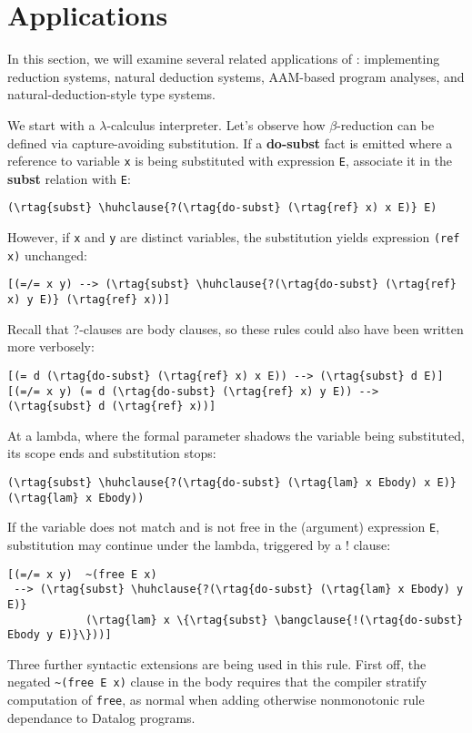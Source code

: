 \section{Applications}
\label{sec:apps}
%
In this section, we will examine several related applications of \slog{}: implementing reduction systems, natural deduction systems, AAM-based program analyses, and natural-deduction-style type systems. 

We start with a $\lambda$-calculus interpreter. Let's observe how $\beta$-reduction can be defined via capture-avoiding substitution. If a \textbf{do-subst} fact is emitted where a reference to variable \texttt{x} is being substituted with expression \texttt{E}, associate it in the \textbf{subst} relation with \texttt{E}:
%
\begin{Verbatim}[baselinestretch=0.8,commandchars=\\\{\}]
(\rtag{subst} \huhclause{?(\rtag{do-subst} (\rtag{ref} x) x E)} E)
\end{Verbatim}
%
However, if \texttt{x} and \texttt{y} are distinct variables, the substitution yields expression \texttt{(ref x)} unchanged:
%
\begin{Verbatim}[baselinestretch=0.8,commandchars=\\\{\}]
[(=/= x y) --> (\rtag{subst} \huhclause{?(\rtag{do-subst} (\rtag{ref} x) y E)} (\rtag{ref} x))]
\end{Verbatim}
%
Recall that ?-clauses are body clauses, so these rules could also have been written more verbosely:
%
\begin{Verbatim}[baselinestretch=0.8,commandchars=\\\{\}]
[(= d (\rtag{do-subst} (\rtag{ref} x) x E)) --> (\rtag{subst} d E)]
[(=/= x y) (= d (\rtag{do-subst} (\rtag{ref} x) y E)) --> (\rtag{subst} d (\rtag{ref} x))]
\end{Verbatim}

At a lambda, where the formal parameter shadows the variable being substituted, its scope ends and substitution stops:
%
\begin{Verbatim}[baselinestretch=0.8,commandchars=\\\{\}]
(\rtag{subst} \huhclause{?(\rtag{do-subst} (\rtag{lam} x Ebody) x E)} (\rtag{lam} x Ebody))
\end{Verbatim}
%
If the variable does not match and is not free in the (argument) expression \texttt{E}, substitution may continue under the lambda, triggered by a ! clause:
%
\begin{Verbatim}[baselinestretch=0.8,commandchars=\\\{\}]
[(=/= x y)  ~(free E x)   
 --> (\rtag{subst} \huhclause{?(\rtag{do-subst} (\rtag{lam} x Ebody) y E)}
            (\rtag{lam} x \{\rtag{subst} \bangclause{!(\rtag{do-subst} Ebody y E)}\}))]
\end{Verbatim}
%
Three further syntactic extensions are being used in this rule. First off, the negated \texttt{\textasciitilde{}(free E x)} clause in the body requires that the compiler stratify computation of \texttt{free}, as normal when adding otherwise nonmonotonic rule dependance to Datalog programs.

